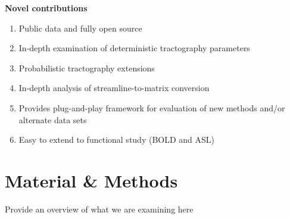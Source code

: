\documentclass{frontiersSCNS} %
\begin{document}


\textbf{Novel contributions}
\begin{enumerate}
\item Public data and fully open source
\item In-depth examination of deterministic tractography parameters
\item Probabilistic tractography extensions
\item In-depth analysis of streamline-to-matrix conversion
\item Provides plug-and-play framework for evaluation of new methods and/or alternate data sets
\item Easy to extend to functional study (BOLD and ASL) 
\end{enumerate}


\section{Material \& Methods}
Provide an overview of what we are examining here
\end{document}
